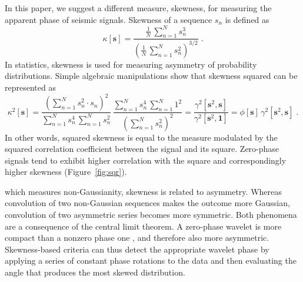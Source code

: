 In this paper, we suggest a different measure, skewness, for
measuring the apparent phase of seismic signals. Skewness of a
sequence $s_n$ is defined
as \cite[]{bulmer}
\begin{equation}
\label{eq:skew}
\kappa[\mathbf{s}] = \frac{\displaystyle \frac{1}{N}\,\sum\limits_{n=1}^N
  s_n^3}{\displaystyle \left(\frac{1}{N}\,\sum\limits_{n=1}^{N} s_n^2\right)^{3/2}}\;.
\end{equation}
In statistics, skewness is used for measuring asymmetry of probability distributions.
Simple algebraic manipulations show that skewness squared can be
represented as
\begin{equation}
\label{eq:kappa2}
\kappa^2[\mathbf{s}] = \frac{\displaystyle \left(\sum\limits_{n=1}^N
  s_n^2\cdot s_n\right)^2}{\displaystyle \sum\limits_{n=1}^N s_n^4\,\sum\limits_{n=1}^N s_n^2}\,\frac{\displaystyle \sum\limits_{n=1}^N s_n^4\,\sum\limits_{n=1}^N 1^2}{\displaystyle \left(\sum\limits_{n=1}^N s_n^2\right)^2} =
\frac{\gamma^2[\mathbf{s}^2,\mathbf{s}]}{\gamma^2[\mathbf{s}^2,\mathbf{1}]}
= \phi[\mathbf{s}]\,\gamma^2[\mathbf{s}^2,\mathbf{s}]\;.
\end{equation}
In other words, squared skewness is equal to the   measure
modulated by the squared correlation coefficient between the signal
and its square. Zero-phase signals
tend to exhibit higher correlation with the square and correspondingly
higher skewness (Figure~\ref{fig:sqr}). 


  which measures non-Gaussianity, skewness
is related to asymmetry. Whereas convolution of two non-Gaussian
sequences makes the outcome more Gaussian, convolution of two
asymmetric series becomes more symmetric. Both phenomena are a
consequence of the central limit theorem. A zero-phase wavelet is more
compact than a nonzero phase one \cite[]{Schoenberger74}, and
therefore also more asymmetric. Skewness-based criteria can thus
detect the appropriate wavelet phase by applying a series of constant
phase rotations to the data and then evaluating the angle that
produces the most skewed distribution.


